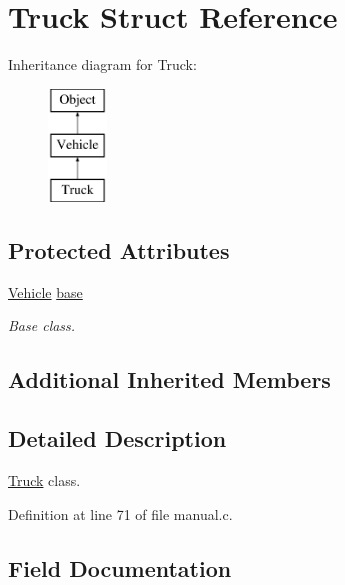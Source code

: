 \hypertarget{struct_truck}{}\section{Truck Struct Reference}
\label{struct_truck}
Inheritance diagram for Truck\+:\begin{figure}[H]
\begin{center}
\leavevmode
\includegraphics[height=3.000000cm]{struct_truck}
\end{center}
\end{figure}
\subsection*{Protected Attributes}
\begin{DoxyCompactItemize}
\item 
\hyperlink{struct_vehicle}{Vehicle} \hyperlink{struct_truck_aea78492ff0e6add272aedd448bf00b6c}{base}
\begin{DoxyCompactList}\small\item\em Base class. \end{DoxyCompactList}\end{DoxyCompactItemize}
\subsection*{Additional Inherited Members}


\subsection{Detailed Description}
\hyperlink{struct_truck}{Truck} class. 

Definition at line 71 of file manual.\+c.



\subsection{Field Documentation}
\mbox{\label{struct_truck_aea78492ff0e6add272aedd448bf00b6c}} 
